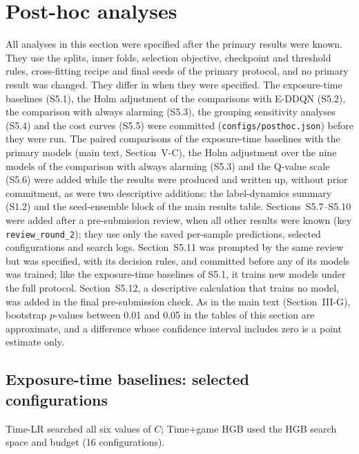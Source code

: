 \section{Post-hoc analyses}
\label{sec:s-posthoc}
All analyses in this section were specified after the primary results were known. They use the splits, inner folds, selection objective, checkpoint and threshold rules, cross-fitting recipe and final seeds of the primary protocol, and no primary result was changed. They differ in when they were specified. The exposure-time baselines (S5.1), the Holm adjustment of the comparisons with E-DDQN (S5.2), the comparison with always alarming (S5.3), the grouping sensitivity analyses (S5.4) and the cost curves (S5.5) were committed (\texttt{configs/\allowbreak posthoc.json}) before they were run. The paired comparisons of the exposure-time baselines with the primary models (main text, Section~V-C), the Holm adjustment over the nine models of the comparison with always alarming (S5.3) and the Q-value scale (S5.6) were added while the results were produced and written up, without prior commitment, as were two descriptive additions: the label-dynamics summary (S1.2) and the seed-ensemble block of the main results table. Sections~S5.7--S5.10 were added after a pre-submission review, when all other results were known (key \texttt{review\_round\_2}); they use only the saved per-sample predictions, selected configurations and search logs. Section~S5.11 was prompted by the same review but was specified, with its decision rules, and committed before any of its models was trained; like the exposure-time baselines of S5.1, it trains new models under the full protocol. Section~S5.12, a descriptive calculation that trains no model, was added in the final pre-submission check. As in the main text (Section~III-G), bootstrap $p$-values between 0.01 and 0.05 in the tables of this section are approximate, and a difference whose confidence interval includes zero is a point estimate only.

\subsection{Exposure-time baselines: selected configurations}
Time-LR searched all six values of $C$; Time+game HGB used the HGB search space and budget (16 configurations).

\begin{center}\footnotesize

\end{center}

